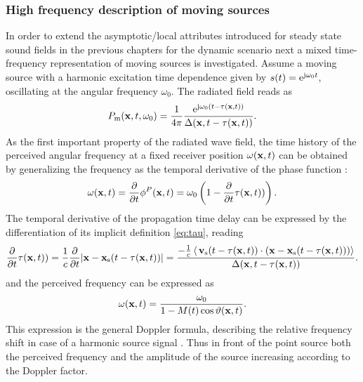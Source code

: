 \subsubsection{High frequency description of moving sources}
In order to extend the asymptotic/local attributes introduced for steady state sound fields in the previous chapters for the dynamic scenario next a mixed time-frequency representation of moving sources is investigated.
Assume a moving source with a harmonic excitation time dependence given by $s(t) = \mathrm{e}^{\mathrm{j} \omega_0 t}$, oscillating at the angular frequency $\omega_0$.
The radiated field reads as
\begin{equation}
P_{\mathrm{m}}(\mathbf{x},t,\omega_0) = \frac{1}{4\pi}\frac{\mathrm{e}^{\mathrm{j} \omega_0\left( t - \tau( \mathbf{x},t )\right)}}{\Delta(\mathbf{x},t-\tau( \mathbf{x}, t ))}.
\label{eq:harmonic_moving_source_field}
\end{equation}
As the first important property of the radiated wave field, the time history of the perceived angular frequency at a fixed receiver position $\omega(\mathbf{x},t)$ can be obtained by generalizing the frequency as the temporal derivative of the phase function \cite{Morse1968}:
\begin{equation}
\omega(\mathbf{x},t) = \frac{\partial}{\partial t}\phi^P(\mathbf{x},t) =  \omega_0 \left( 1 - \frac{\partial}{\partial t} \tau(\mathbf{x},t)) \right).
\end{equation}
The temporal derivative of the propagation time delay can be expressed by the differentiation of its implicit definition \eqref{eq:tau}, reading
\begin{equation} 
\frac{\partial}{\partial t} \tau(\mathbf{x},t)) = \frac{1}{c}\frac{\partial}{\partial t} | \mathbf{x} - \mathbf{x}_{\mathrm{s}}( t - \tau(\mathbf{x},t)) |  =
\frac{-\frac{1}{c} \left<\, \mathbf{v}_{\mathrm{s}}(t-\tau(\mathbf{x},t)) \cdot (\mathbf{x} - \mathbf{x}_{\mathrm{s}}(t-\tau(\mathbf{x},t))) \right> }{\Delta(\mathbf{x},t-\tau(\mathbf{x},t))}.
\end{equation}
and the perceived frequency can be expressed as 
\begin{equation}
\omega(\mathbf{x},t) =\frac{  \omega_0  }{1 - M(t) \cos \vartheta(\mathbf{x},t) }.
\end{equation}
This expression is the general Doppler formula, describing the relative frequency shift in case of a harmonic source signal \cite{Morse1968}. 
Thus in front of the point source both the perceived frequency and the amplitude of the source increasing according to the Doppler factor.

